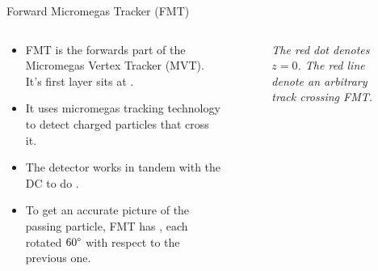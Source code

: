 \begin{frame}{Forward Micromegas Tracker (FMT)}
    \label{10.34::fmt}

    \begin{columns}[onlytextwidth,T]

    \begin{column}{.48\linewidth}
        \vspace{6pt}
        \begin{itemize}
            \item
                FMT is the forwards part of the Micromegas Vertex Tracker (MVT).
                It's first layer sits at .

            \vspace{6pt}
            \item
                It uses micromegas tracking technology to detect charged particles that cross it.

            \vspace{6pt}
            \item
                The detector works in tandem with the DC to do .

            \vspace{6pt}
            \item
                To get an accurate picture of the passing particle, FMT has , each rotated $60\degree$ with respect to the previous one.

        \end{itemize}
    \end{column}

    \begin{column}{.50\linewidth}
        \begin{center}
            \begin{figure}[t]

                \scriptsize{\textit{
                    The red dot denotes $z=0$.
                    The red line denote an arbitrary track crossing FMT.
                }}
            \end{figure}
        \end{center}
    \end{column}

    \end{columns}
\end{frame}
